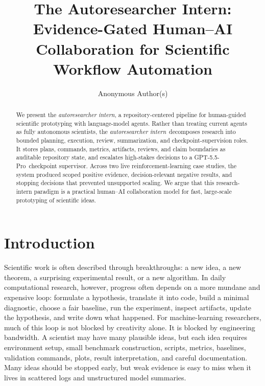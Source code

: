 \documentclass{article}
\title{The Autoresearcher Intern: Evidence-Gated Human--AI Collaboration for Scientific Workflow Automation}
\author{Anonymous Author(s)}
\newcommand{\intern}{\emph{autoresearcher intern}}
\newcommand{\gptpro}{GPT-5.5-Pro}
\begin{document}
\ifcolmsubmission
\linenumbers
\fi

\maketitle

\begin{abstract}
We present the \intern, a repository-centered pipeline for human-guided scientific prototyping with language-model agents. Rather than treating current agents as fully autonomous scientists, the \intern\ decomposes research into bounded planning, execution, review, summarization, and checkpoint-supervision roles. It stores plans, commands, metrics, artifacts, reviews, and claim boundaries as auditable repository state, and escalates high-stakes decisions to a \gptpro\ checkpoint supervisor. Across two live reinforcement-learning case studies, the system produced scoped positive evidence, decision-relevant negative results, and stopping decisions that prevented unsupported scaling. We argue that this research-intern paradigm is a practical human--AI collaboration model for fast, large-scale prototyping of scientific ideas.
\end{abstract}

\section{Introduction}

Scientific work is often described through breakthroughs: a new idea, a new theorem, a surprising experimental result, or a new algorithm. In daily computational research, however, progress often depends on a more mundane and expensive loop: formulate a hypothesis, translate it into code, build a minimal diagnostic, choose a fair baseline, run the experiment, inspect artifacts, update the hypothesis, and write down what happened. For machine-learning researchers, much of this loop is not blocked by creativity alone. It is blocked by engineering bandwidth. A scientist may have many plausible ideas, but each idea requires environment setup, small benchmark construction, scripts, metrics, baselines, validation commands, plots, result interpretation, and careful documentation. Many ideas should be stopped early, but weak evidence is easy to miss when it lives in scattered logs and unstructured model summaries.
\end{document}
